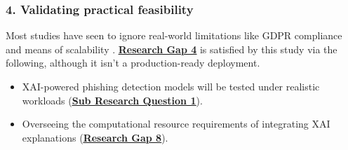 
\subsubsection*{4. Validating practical feasibility}
Most studies have seen to ignore real-world limitations like GDPR compliance and means of scalability \citep{kapoor2024comparative}. \hyperref[research-gap-4]{\uline{\textbf{Research Gap 4}}} is satisfied by this study via the following, although it isn't a production-ready deployment.

\begin{itemize}
  \item XAI-powered phishing detection models will be tested under realistic workloads (\hyperref[sub-research-q1]{\uline{\textbf{Sub Research Question 1}}}).
  \item Overseeing the computational resource requirements of integrating XAI explanations (\hyperref[research-gap-8]{\uline{\textbf{Research Gap 8}}}).
\end{itemize}

